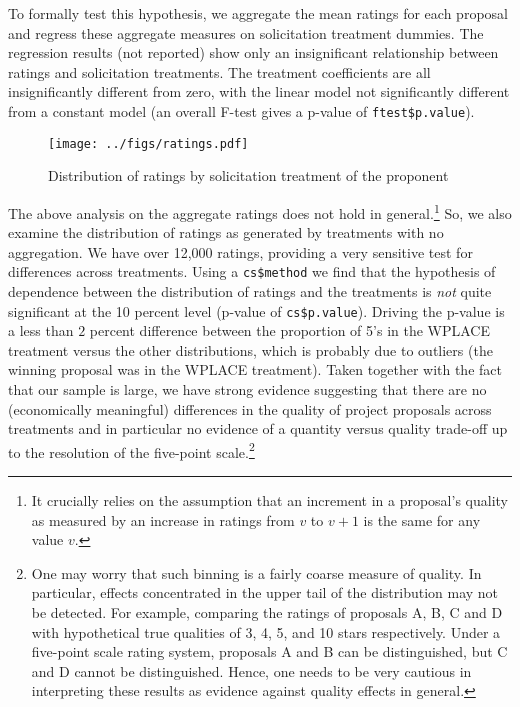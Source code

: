 \documentclass[11pt, titlepage]{article}
\begin{document}
To formally test this hypothesis, we aggregate the mean ratings for each
proposal and regress these aggregate measures on solicitation treatment
dummies. The regression results (not reported) show only an
insignificant relationship between ratings and solicitation treatments.
The treatment coefficients are all insignificantly different from zero,
with the linear model not significantly different from a constant model
(an overall F-test gives a p-value of \texttt{ftest\$p.value}).

\begin{figure}
  \centering
  \caption{Distribution of ratings by solicitation treatment of the proponent}
  \label{ratings}
  \texttt{[image: ../figs/ratings.pdf]}
\end{figure}

The above analysis on the aggregate ratings does not hold in
general.\footnote{It crucially relies on the assumption that an
  increment in a proposal's quality as measured by an increase in
  ratings from \(v\) to \(v+1\) is the same for any value \(v\).} So, we
also examine the distribution of ratings as generated by treatments with
no aggregation. We have over 12,000 ratings, providing a very sensitive
test for differences across treatments. Using a \texttt{cs\$method} we
find that the hypothesis of dependence between the distribution of
ratings and the treatments is \emph{not} quite significant at the 10
percent level (p-value of \texttt{cs\$p.value}). Driving the p-value is
a less than \(2\) percent difference between the proportion of 5's in
the WPLACE treatment versus the other distributions, which is probably
due to outliers (the winning proposal was in the WPLACE treatment).
Taken together with the fact that our sample is large, we have strong
evidence suggesting that there are no (economically meaningful)
differences in the quality of project proposals across treatments and in
particular no evidence of a quantity versus quality trade-off up to the
resolution of the five-point scale.\footnote{One may worry that such
  binning is a fairly coarse measure of quality. In particular, effects
  concentrated in the upper tail of the distribution may not be
  detected. For example, comparing the ratings of proposals A, B, C and
  D with hypothetical true qualities of 3, 4, 5, and 10 stars
  respectively. Under a five-point scale rating system, proposals A and
  B can be distinguished, but C and D cannot be distinguished. Hence,
  one needs to be very cautious in interpreting these results as
  evidence against quality effects in general.}
\end{document}
